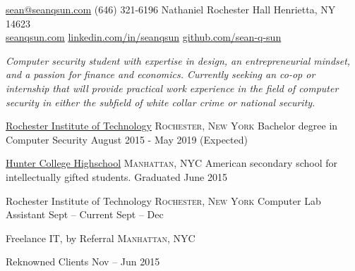 \documentclass[10pt,a4paper]{article}
\begin{document}
\sloppy 



\nobreakvspace{0.3em}  %

\noindent\href{mailto:sean.at.seanqsun.dot.com}{sean\mbox{}@\mbox{}seanqsun.com}\sbull
(646) 321-6196 Nathaniel Rochester Hall Henrietta, NY 14623
\\
\noindent\href{http://www.seanqsun.com}{seanqsun.com}\sbull
\href{http://www.linkedin.com/in/ciesbreijs}{linkedin.com/in/seanqsun}\sbull
\href{https://www.github.com/sean-q-sun}{github.com/sean-q-sun}

\spacedhrule{0.2em}{-0.4em}  %

\noindent \emph{Computer security student with expertise in design, an entrepreneurial mindset, and a passion for finance and economics. Currently seeking an co-op or internship that will provide practical work experience in the field of computer security in either the subfield of white collar crime or national security.}

\spacedhrule{0.2em}{-0.4em}


\headedsection
  {\href{https://www.rit.edu/gccis/computingsecurity/}{Rochester Institute of Technology}}
  {\textsc{Rochester, New York}} {
  \headedsubsection
    {Bachelor degree in Computer Security}
    {August 2015 - May 2019 (Expected)} 
    {}
}

\headedsection
  {\href{http://www.hunterschools.org/hs}{Hunter College Highschool}}
  {\textsc{Manhattan, NYC}} {
  \headedsubsection
    {American secondary school for intellectually gifted students.}
    {Graduated June 2015} {}
}


\spacedhrule{0em}{-0.4em}

\headedsection  %
  {Rochester Institute of Technology}
  {\textsc{Rochester, New York}} {
  \headedsubsection
  {Computer Lab Assistant}
  {Sept  -- Current}
  {}
    {Sept  -- Dec }
    {}
}

\headedsection  %
  {Freelance IT, by Referral}
  {\textsc{Manhattan, NYC}} {
  \headedsubsection
  {Reknowned Clients}
  {Nov  -- Jun 2015}
  {}

}
\end{document}
